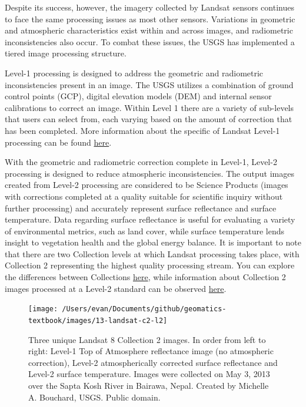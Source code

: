 \documentclass[
]{book}
\begin{document}
Despite its success, however, the imagery collected by Landsat sensors
continues to face the same processing issues as most other sensors.
Variations in geometric and atmospheric characteristics exist within and
across images, and radiometric inconsistencies also occur. To combat
these issues, the USGS has implemented a tiered image processing
structure.

Level-1 processing is designed to address the geometric and radiometric
inconsistencies present in an image. The USGS utilizes a combination of
ground control points (GCP), digital elevation models (DEM) and internal
sensor calibrations to correct an image. Within Level 1 there are a
variety of sub-levels that users can select from, each varying based on
the amount of correction that has been completed. More information about
the specific of Landsat Level-1 processing can be found
\href{https://www.usgs.gov/core-science-systems/nli/landsat/landsat-level-1-processing-details}{here}.

With the geometric and radiometric correction complete in Level-1,
Level-2 processing is designed to reduce atmospheric inconsistencies.
The output images created from Level-2 processing are considered to be
Science Products (images with corrections completed at a quality
suitable for scientific inquiry without further processing) and
accurately represent surface reflectance and surface temperature. Data
regarding surface reflectance is useful for evaluating a variety of
environmental metrics, such as land cover, while surface temperature
lends insight to vegetation health and the global energy balance. It is
important to note that there are two Collection levels at which Landsat
processing takes place, with Collection 2 representing the highest
quality processing stream. You can explore the differences between
Collections
\href{https://prd-wret.s3.us-west-2.amazonaws.com/assets/palladium/production/atoms/files/Landsat-C1vsC2-2021-0430-LMWS.pdf}{here},
while information about Collection 2 images processed at a Level-2
standard can be observed
\href{https://www.usgs.gov/core-science-systems/nli/landsat/landsat-collection-2-level-2-science-products}{here}.

\begin{figure}
\texttt{[image: /Users/evan/Documents/github/geomatics-textbook/images/13-landsat-c2-l2]} \caption{Three unique Landsat 8 Collection 2 images. In order from left to right: Level-1 Top of Atmosphere reflectance image (no atmospheric correction), Level-2 atmospherically corrected surface reflectance and Level-2 surface temperature. Images were collected on May 3, 2013 over the Sapta Kosh River in Bairawa, Nepal. Created by Michelle A. Bouchard, USGS. Public domain.}\label{fig:13-landsat-c2-l2}
\end{figure}
\end{document}
